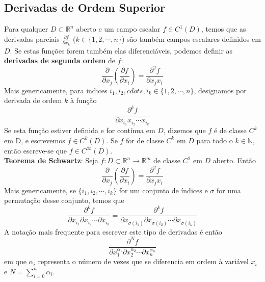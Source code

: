 \documentclass{article}
\newcommand{\R}{\mathbb{R}}
\begin{document}
\subsection{Derivadas de Ordem Superior}
Para qualquer $D \subset \R^n$ aberto e um campo escalar $f \in C^1(D)$, temos que as derivadas parciais $\frac{\partial f}{\partial x_k}$ ($k \in \{ 1, 2, \cdots, n \}$) são também campos escalares definidos em $D$. Se estas funções forem também elas diferenciáveis, podemos definir as \textbf{derivadas de segunda ordem} de $f$:
$$
\frac{\partial}{\partial x_j} \left( \frac{\partial f}{\partial x_i} \right) = \frac{\partial ^2 f}{\partial x_j x_i}
$$
Mais genericamente, para indices $i_1, i_2, cdots , i_k \in \{ 1, 2, \cdots , n \}$, designamos por derivada de ordem $k$ à função
$$
\frac{\partial ^k f}{\partial x_{i_1}x_{i_2} \cdots x_{i_k}}
$$
Se esta função estiver definida e for contínua em $D$, dizemos que $f$ é de classe $C^k$ em D, e escrevemos $f \in C^k(D)$. Se $f$ for de classe $C^k$ em $D$ para todo o $k \in \mathbb{N}$, então escreve-se que $f \in C ^\infty (D)$.\\

\textbf{Teorema de Schwartz}: Seja $f: D \subset \R^n \to \R^m$ de classe $C^2$ em $D$ aberto. Então
$$
\frac{\partial}{\partial x_j} \left( \frac{\partial f}{\partial x_i} \right) = \frac{\partial ^2 f}{\partial x_j x_i}
$$
Mais genericamente, se $\{ i_1, i_2, \cdots, i_k \}$ for um conjunto de índices e $\sigma$ for uma permutação desse conjunto, temos que
$$
\frac{\partial ^k f}{\partial x_{i_1} \partial x_{i_2} \cdots \partial x_{i_k}} = \frac{\partial ^k f}{\partial x_{\sigma(i_1)} \partial x_{\sigma(i_2)} \cdots \partial x_{\sigma(i_k)}}
$$
A notação mais frequente para escrever este tipo de derivadas é então
$$
\frac{\partial ^N f}{\partial x_1^{\alpha_1} \partial x_2^{\alpha_2} \cdots \partial x_n ^{\alpha_n}}
$$
em que $\alpha_i$ representa o número de vezes que se diferencia em ordem à variável $x_i$ e $N = \sum_{i=0}^n \alpha_i$.
\end{document}
